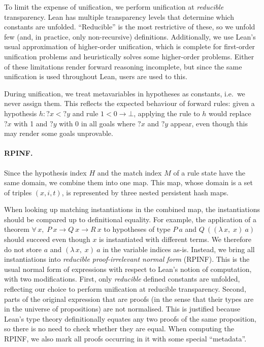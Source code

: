 \documentclass[runningheads]{llncs}
\newcommand{\Lam}[2]{\ensuremath{\lambda\, #1,\; #2}}
\newcommand{\All}[2]{\ensuremath{\forall\, #1,\; #2}}
\newcommand{\mvar}[1]{\ensuremath{?#1}}
\begin{document}
To limit the expense of unification, we perform unification at \emph{reducible} transparency.
Lean has multiple transparency levels that determine which constants are unfolded.
\enquote{Reducible} is the most restrictive of these, so we unfold few (and, in practice, only non-recursive) definitions.
Additionally, we use Lean's usual approximation of higher-order unification, which is complete for first-order unification problems and heuristically solves some higher-order problems.
Either of these limitations render forward reasoning incomplete, but since the same unification is used throughout Lean, users are used to this.

During unification, we treat metavariables in hypotheses as constants, i.e.\ we never assign them.
This reflects the expected behaviour of forward rules: given a hypothesis $h : \mvar{x} < \mvar{y}$ and rule $1 < 0 → ⊥$, applying the rule to $h$ would replace $\mvar{x}$ with 1 and $\mvar{y}$ with 0 in all goals where $\mvar{x}$ and $\mvar{y}$ appear, even though this may render some goals unprovable.

\paragraph{RPINF.}
Since the hypothesis index $H$ and the match index $M$ of a rule state have the same domain, we combine them into one map.
This map, whose domain is a set of triples $(x, i, t)$, is represented by three nested persistent hash maps.

When looking up matching instantiations in the combined map, the instantiations should be compared up to definitional equality.
For example, the application of a theorem $\All{x}{P~x → Q~x → R~x}$ to hypotheses of type $P~a$ and $Q~((\Lam{x}{x})~a)$ should succeed even though $x$ is instantiated with different terms.
We therefore do not store $a$ and $(\Lam{x}{x})~a$ in the variable indices as-is.
Instead, we bring all instantiations into \emph{reducible proof-irrelevant normal form} (RPINF).
This is the usual normal form of expressions with respect to Lean's notion of computation, with two modifications.
First, only \emph{reducible} defined constants are unfolded, reflecting our choice to perform unification at reducible transparency.
Second, parts of the original expression that are proofs (in the sense that their types are in the universe of propositions) are not normalised.
This is justified because Lean's type theory definitionally equates any two proofs of the same proposition, so there is no need to check whether they are equal.
When computing the RPINF, we also mark all proofs occurring in it with some special \enquote{metadata}.
\end{document}
